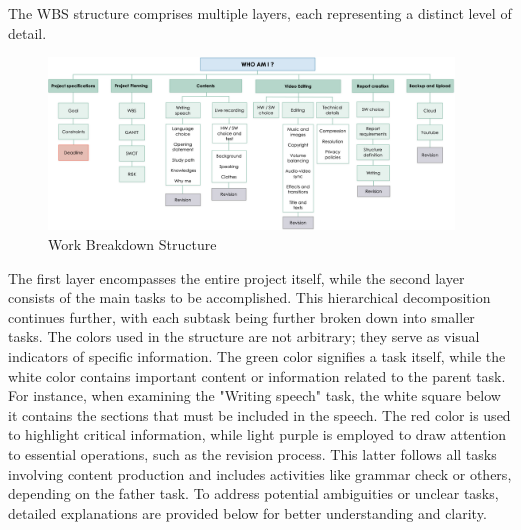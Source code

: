 \documentclass{article}
\begin{document}
\begin{multicols}{2}
        

    \noindent
    The WBS structure comprises multiple layers, each representing a distinct level of detail. 
    \begin{figure}[H]
        \centering
        \includegraphics[width=0.96\textwidth]{WBS.png}
        \caption{Work Breakdown Structure}
        \label{fig:wbs}
    \end{figure}
    
    The first layer encompasses the entire project itself, 
    while the second layer consists of the main tasks to be accomplished.  
    This hierarchical decomposition continues further, with each subtask being further broken down into smaller tasks.
    The colors used in the structure are not arbitrary; they serve as visual indicators of specific information. The green color signifies a task itself, 
    while the white color contains important content or information related to the parent task. For instance, when examining the "Writing speech" task, the 
    white square below it contains the sections that must be included in the speech. The red color is used to highlight critical information, while light 
    purple is employed to draw attention to essential operations, such as the revision process. This latter follows all tasks involving 
    content production and includes activities like grammar check or others, depending on the father task.
    To address potential ambiguities or unclear tasks, detailed explanations are provided below for better understanding and clarity.
    

\end{multicols}
\end{document}

